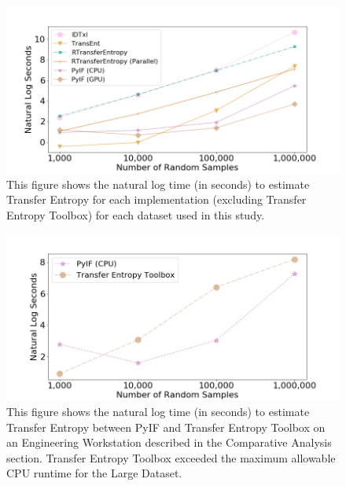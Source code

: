 \begin{figure}
  \centerline{\includegraphics[scale=0.8]{figures/PyIF/WallTime-TE.png}}
  \caption{This figure shows the natural log time (in seconds) to estimate Transfer Entropy for each implementation (excluding Transfer Entropy Toolbox) for each dataset used in this study. }
  \label{TE-walltime}
\end{figure}


\begin{figure}
  \centerline{\includegraphics[scale=0.8]{figures/PyIF/WallTime-TE2.png}}
  \caption{This figure shows the natural log time (in seconds) to estimate Transfer Entropy between PyIF and Transfer Entropy Toolbox on an Engineering Workstation described in the Comparative Analysis section. Transfer Entropy Toolbox exceeded the maximum allowable CPU runtime for the Large Dataset. }
  \label{TE-walltime2}
\end{figure}

\clearpage



